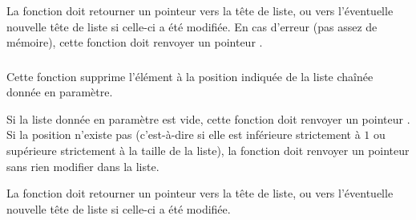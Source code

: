 \smallskip

\noindent La fonction doit retourner un pointeur vers la tête de liste, ou vers l'éventuelle nouvelle tête de liste si celle-ci a été modifiée.
%
En cas d'erreur (pas assez de mémoire), cette fonction doit renvoyer un pointeur .

%

\bigskip


\subsubsection*{}

\noindent Cette fonction supprime l'élément à la position indiquée de la liste chaînée donnée en paramètre.

\smallskip

\noindent Si la liste donnée en paramètre est vide, cette fonction doit renvoyer un pointeur .
Si la position n'existe pas (c'est-à-dire si elle est inférieure strictement à $ 1 $ ou supérieure strictement à la taille de la liste), la fonction doit renvoyer un pointeur  sans rien modifier dans la liste.

\smallskip

\noindent La fonction doit retourner un pointeur vers la tête de liste, ou vers l'éventuelle nouvelle tête de liste si celle-ci a été modifiée.

%

\bigskip


\subsubsection*{}

